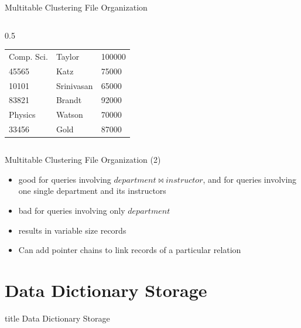 \documentclass[aspectratio=169, xcolor=dvipsnames]{beamer}
\begin{document}
\begin{frame}{Multitable Clustering File Organization}
\begin{columns}
\begin{column}{0.5\textwidth}
\begin{table}[]
{\begin{tabular}{lll}
                    \toprule
                    \rowcolor{blue!20} Comp. Sci. & Taylor     &   100000 \\
                    45565        & Katz       &    75000 \\
                    10101        & Srinivasan &    65000 \\
                    83821        & Brandt     &    92000 \\
                    \rowcolor{blue!20} Physics      & Watson     &    70000 \\
                    33456        & Gold       &    87000 \\ \bottomrule
                    \end{tabular}
                }
            \end{table}
        \end{column}
    \end{columns}
\end{frame}

\begin{frame}{Multitable Clustering File Organization (2)}
    \begin{block}{}
        \begin{itemize}[<+->]
            \item good for queries involving $department \Join instructor$, and for queries involving one single department and its instructors
            \item bad for queries involving only $department$
            \item results in variable size records
            \item Can add pointer chains to link records of a particular relation
        \end{itemize}
    \end{block}
\end{frame}

\section{Data Dictionary Storage}

\begin{frame}
  \vfill
  \centering
  \begin{beamercolorbox}[sep=8pt,center,shadow=true,rounded=true]{title}
    Data Dictionary Storage\par%
  \end{beamercolorbox}
  \vfill
\end{frame}
\end{document}
